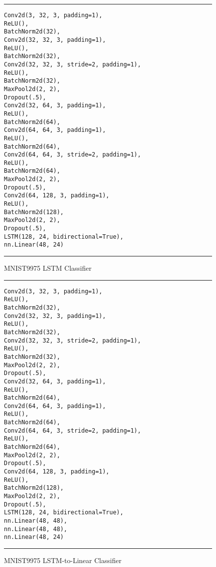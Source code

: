 \begin{figure}
  \caption{MNIST9975 LSTM Classifier}
  \label{fig:cnnMNISTCNNLSTM}
  \par\noindent\rule{\textwidth}{0.5pt}
  \begin{\codefigsize}
  \begin{lstlisting}
Conv2d(3, 32, 3, padding=1),
ReLU(),
BatchNorm2d(32),
Conv2d(32, 32, 3, padding=1),
ReLU(),
BatchNorm2d(32),
Conv2d(32, 32, 3, stride=2, padding=1),
ReLU(),
BatchNorm2d(32),
MaxPool2d(2, 2),
Dropout(.5),
Conv2d(32, 64, 3, padding=1),
ReLU(),
BatchNorm2d(64),
Conv2d(64, 64, 3, padding=1),
ReLU(),
BatchNorm2d(64),
Conv2d(64, 64, 3, stride=2, padding=1),
ReLU(),
BatchNorm2d(64),
MaxPool2d(2, 2),
Dropout(.5),
Conv2d(64, 128, 3, padding=1),
ReLU(),
BatchNorm2d(128),
MaxPool2d(2, 2),
Dropout(.5),
LSTM(128, 24, bidirectional=True),
nn.Linear(48, 24)
  \end{lstlisting}
  \end{\codefigsize}
  \par\noindent\rule{\textwidth}{0.5pt}
\end{figure}

\begin{figure}
  \caption{MNIST9975 LSTM-to-Linear Classifier}
  \label{fig:cnnMNISTCNNLSTM2Linear}
  \par\noindent\rule{\textwidth}{0.5pt}
  \begin{\codefigsize}
  \begin{lstlisting}
Conv2d(3, 32, 3, padding=1),
ReLU(),
BatchNorm2d(32),
Conv2d(32, 32, 3, padding=1),
ReLU(),
BatchNorm2d(32),
Conv2d(32, 32, 3, stride=2, padding=1),
ReLU(),
BatchNorm2d(32),
MaxPool2d(2, 2),
Dropout(.5),
Conv2d(32, 64, 3, padding=1),
ReLU(),
BatchNorm2d(64),
Conv2d(64, 64, 3, padding=1),
ReLU(),
BatchNorm2d(64),
Conv2d(64, 64, 3, stride=2, padding=1),
ReLU(),
BatchNorm2d(64),
MaxPool2d(2, 2),
Dropout(.5),
Conv2d(64, 128, 3, padding=1),
ReLU(),
BatchNorm2d(128),
MaxPool2d(2, 2),
Dropout(.5),
LSTM(128, 24, bidirectional=True),
nn.Linear(48, 48),
nn.Linear(48, 48),
nn.Linear(48, 24)
  \end{lstlisting}
  \end{\codefigsize}
  \par\noindent\rule{\textwidth}{0.5pt}
\end{figure}
